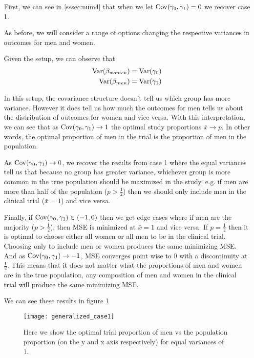 First, we can see in \ref{sssec:num4} that when we let  $\mathrm{Cov}(\gamma_0, \gamma_1) = 0$ we recover case 1.

As before, we will consider a range of options changing the respective variances in outcomes for men and women.

Given the setup, we can observe that
\begin{align*}
	\mathrm{Var}(\beta_{women}) &= \mathrm{Var}(\gamma_0) \\
	\mathrm{Var}(\beta_{men}) &= \mathrm{Var}(\gamma_1)
\end{align*} 

In this setup, the covariance structure doesn't tell us which group has more variance. However it does tell us how much the outcomes for men tells us about the distribution of outcomes for women and vice versa. 
With this interpretation, we can see that as $\mathrm{Cov}(\gamma_0, \gamma_1) \to 1$ the optimal study proportions $\bar{x} \to p$. In other words, the optimal proportion of men in the trial is the proportion of men in the population.

As $\mathrm{Cov}(\gamma_0, \gamma_1) \to 0$, we recover the results from case 1 where the equal variances tell us that because no group has greater variance, whichever group is more common in the true population should be maximized in the study.  e.g. if men are more than half of the population ($p >  \frac{1}{2}$) then we should only include men in the clinical trial ($\bar{x} = 1$) and vice versa.

Finally, if $\mathrm{Cov}(\gamma_0, \gamma_1) \in (-1,0)$ then we get edge cases where if men are the majority ($p > \frac{1}{2}$), then MSE is minimized at $\bar{x} = 1$ and vice versa.
If $p=\frac{1}{2}$ then it is optimal to choose either all women or all men to be in the clinical trial. Choosing only to include men or women produces the same minimizing MSE. 
And as $\mathrm{Cov}(\gamma_0, \gamma_1) \to -1$, MSE converges point wise to 0 with a discontinuity at $\frac{1}{2}$. This means that it does not matter what the proportions of men and women are in the true population, any composition of men and women in the clinical trial will produce the same minimizing MSE.

We can see these results in figure \ref{fig:generalized_case1}

\begin{figure}[ht!]
  \centering
	\texttt{[image: generalized\_case1]}
	\caption{Here we show the optimal trial proportion of men vs the population proportion (on the y and x axis respectively) for equal variances of 1.} 
	\label{fig:generalized_case1}
\end{figure}
